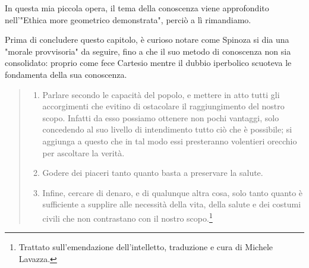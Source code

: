 In questa mia piccola opera, il tema della conoscenza viene approfondito nell'"Ethica more geometrico demonstrata", perciò a lì rimandiamo.

Prima di concludere questo capitolo, è curioso notare come Spinoza si dia una "morale provvisoria" da seguire, fino a che il suo metodo di conoscenza non sia consolidato: proprio come fece Cartesio mentre il dubbio iperbolico scuoteva le fondamenta della sua conoscenza.

\begin{quotation}
	\small \begin{enumerate}
		\item Parlare secondo le capacità del popolo, e mettere in atto tutti gli accorgimenti che evitino
		di ostacolare il raggiungimento del nostro scopo. Infatti da esso possiamo ottenere non pochi
		vantaggi, solo concedendo al suo livello di intendimento tutto ciò che è possibile; si aggiunga a
		questo che in tal modo essi presteranno volentieri orecchio per ascoltare la verità.
		\item Godere dei piaceri tanto quanto basta a preservare la salute.
		\item Infine, cercare di denaro, e di qualunque altra cosa, solo tanto quanto è sufficiente a
		supplire alle necessità della vita, della salute e dei costumi civili che non contrastano con il nostro
		scopo.\footnote{Trattato sull'emendazione dell'intelletto, traduzione e cura di Michele Lavazza.}
	\end{enumerate}
\end{quotation}

\newpage